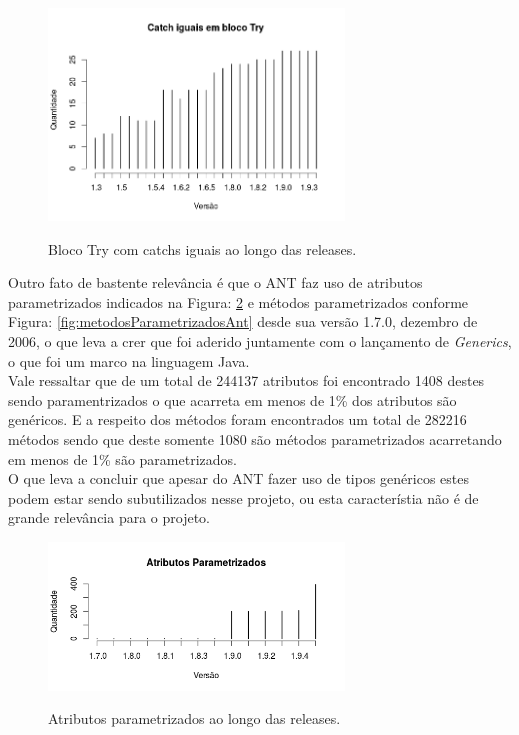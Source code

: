 	\begin{figure}[h]
		\center
		\includegraphics[width=0.7\textwidth]{Imagens/catchsIguais}
		\label{fig:catchIguais}
		\caption{Bloco Try com catchs iguais ao longo das releases.}
	\end{figure}


Outro fato de bastente relevância é que o ANT faz uso de atributos parametrizados indicados na Figura: \ref{fig:atributosParametrizadosAnt}  e métodos parametrizados conforme Figura: \ref{fig:metodosParametrizadosAnt} desde sua versão 1.7.0, dezembro de 2006, o que leva a crer que foi aderido juntamente com o lançamento de \textit{Generics}, o que foi um marco na linguagem Java.\\

Vale ressaltar que de um total de 244137 atributos foi encontrado 1408 destes sendo paramentrizados o que acarreta em menos de 1\% dos atributos são genéricos. E a respeito dos métodos foram encontrados um total de 282216 métodos sendo que deste somente 1080 são métodos parametrizados acarretando em menos de 1\% são parametrizados.\\

O que leva a concluir que apesar do ANT fazer uso de tipos genéricos estes podem estar sendo subutilizados nesse projeto, ou esta característia não é de grande relevância para o projeto.\\



	\begin{figure}[h]
		\center
		\includegraphics[width=0.7\textwidth]{Imagens/atributosParametrizados.png}
		\label{fig:atributosParametrizadosAnt}
		\caption{Atributos parametrizados ao longo das releases.}
	\end{figure}
	
